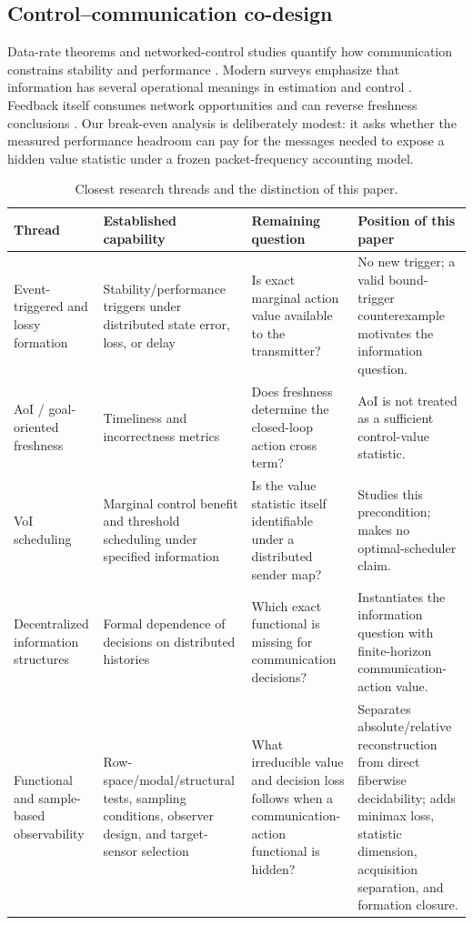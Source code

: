 \documentclass[10pt,twocolumn,twoside]{IEEEtran}
\begin{document}
\subsection{Control--communication co-design}

Data-rate theorems and networked-control studies quantify how communication
constrains stability and performance \cite{tatikonda2004control,
nair2007feedback,hespanha2007survey}.  Modern surveys emphasize that
information has several operational meanings in estimation and control
\cite{franceschetti2023manyfacets}.  Feedback itself consumes network
opportunities and can reverse freshness conclusions \cite{munari2025feedback}.
Our break-even analysis is deliberately modest: it asks whether the measured
performance headroom can pay for the messages needed to expose a hidden value
statistic under a frozen packet-frequency accounting model.

\begin{table}[t]
\caption{Closest research threads and the distinction of this paper.}
\label{tab:prior}
\centering
\scriptsize
\begin{tabular}{p{2.6cm}p{4.1cm}p{4.2cm}p{5.3cm}}
\toprule
Thread & Established capability & Remaining question & Position of this paper \\
\midrule
Event-triggered and lossy formation
& Stability/performance triggers under distributed state error, loss, or delay
& Is exact marginal action value available to the transmitter?
& No new trigger; a valid bound-trigger counterexample motivates the information question. \\
AoI / goal-oriented freshness
& Timeliness and incorrectness metrics
& Does freshness determine the closed-loop action cross term?
& AoI is not treated as a sufficient control-value statistic. \\
VoI scheduling
& Marginal control benefit and threshold scheduling under specified information
& Is the value statistic itself identifiable under a distributed sender map?
& Studies this precondition; makes no optimal-scheduler claim. \\
Decentralized information structures
& Formal dependence of decisions on distributed histories
& Which exact functional is missing for communication decisions?
& Instantiates the information question with finite-horizon communication-action value. \\
Functional and sample-based observability
& Row-space/modal/structural tests, sampling conditions, observer design, and target-sensor selection
& What irreducible value and decision loss follows when a communication-action functional is hidden?
& Separates absolute/relative reconstruction from direct fiberwise decidability; adds minimax loss, statistic dimension, acquisition separation, and formation closure. \\
\bottomrule
\end{tabular}
\end{table}
\end{document}
